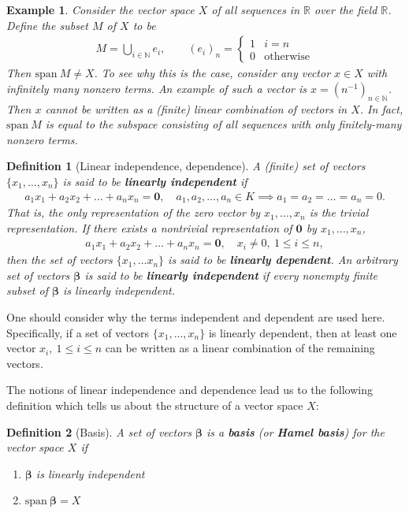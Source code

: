 \documentclass[11pt]{article}
\theoremstyle{mystyle}
\newtheorem{defn}{Definition}[section]
\newtheorem{protoexamp}{Example}[section]
\newenvironment{examp}
{\colorlet{shadecolor}{orange!15}\begin{shaded}\begin{protoexamp}}
{\end{protoexamp}\end{shaded}}
\newcommand{\0}{\mathbf{0}}
\begin{document}
\begin{examp}\label{notlinear}
Consider the vector space $X$ of all sequences in $\mathbb{R}$ over the field $\mathbb{R}$. Define the subset $M$ of $X$ to be
\begin{align*}
  M = \bigcup_{i \in \mathbb{N}} e_i,  \qquad (e_i)_n = \begin{cases}
  1 & i = n\\
  0 & \text{otherwise}
  \end{cases}
\end{align*}
Then $\text{span} \ M \neq X$. To see why this is the case, consider any vector $x \in X$ with infinitely many nonzero terms. An example of such a vector is $x = (n^{-1})_{n \in \mathbb{N}}$. Then $x$ cannot be written as a (finite) linear combination of vectors in $X$. In fact, $\text{span} \ M$ is equal to the subspace consisting of all sequences with only finitely-many nonzero terms.
\end{examp}

\begin{defn}[Linear independence, dependence]
A (finite) set of vectors $\{x_1, \ldots, x_n\}$ is said to be \textbf{linearly independent} if 
\begin{align*}
    a_1 x_1 + a_2 x_2 + \ldots + a_n x_n = \0, \quad a_1, a_2, \ldots, a_n \in K \implies a_1 = a_2 = \ldots = a_n = 0.
\end{align*}
That is, the only representation of the zero vector by $x_1, \ldots, x_n$ is the trivial representation. If there exists a nontrivial representation of $\0$ by $x_1, \ldots, x_n$,
\begin{align*}
    a_1 x_1 + a_2 x_2 + \ldots + a_n x_n = \0, \quad x_i \neq 0, \ 1 \leq i \leq n,
\end{align*}
then the set of vectors $\{x_1, \ldots x_n\}$ is said to be \textbf{linearly dependent}.\newline
An arbitrary set of vectors $\boldsymbol{\beta}$ is said to be \textbf{linearly independent} if every nonempty finite subset of $\boldsymbol{\beta}$ is linearly independent.
\end{defn}
One should consider why the terms independent and dependent are used here. Specifically, if a set of vectors $\{x_1, \ldots, x_n \}$ is linearly dependent, then at least one vector $x_i, \ 1 \leq i \leq n$ can be written as a linear combination of the remaining vectors.

The notions of linear independence and dependence lead us to the following definition which tells us about the structure of a vector space $X$:
\begin{defn}[Basis]
A set of vectors $\boldsymbol{\beta}$ is a \textbf{basis} (or \textbf{Hamel basis}) for the vector space $X$ if
\begin{enumerate}
    \item $\boldsymbol{\beta}$ is linearly independent
    \item $\text{span} \ \boldsymbol{\beta} = X$
\end{enumerate}
\end{defn}
\end{document}
